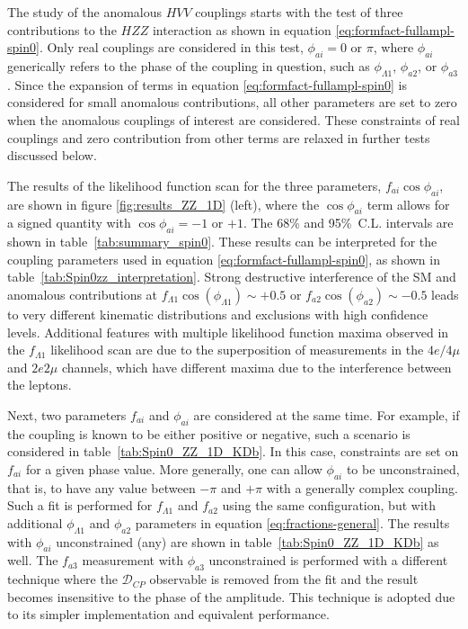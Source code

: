 The study of the anomalous $HVV$ couplings starts with the test of three contributions to the $HZZ$ interaction
as shown in equation \eqref{eq:formfact-fullampl-spin0}. Only real couplings are considered in this test,
$\phi_{ai}=0$ or $\pi$, where $\phi_{ai}$ generically refers to the phase of the coupling in question,
such as $\phi_{\Lambda1}$, $\phi_{a2}$, or $\phi_{a3}$. Since the expansion of terms in equation \eqref{eq:formfact-fullampl-spin0} is considered for small anomalous contributions,
all other parameters are set to zero when the anomalous couplings of interest are considered.
These constraints of real couplings and zero contribution from other terms are relaxed in further tests
discussed below.

The results of the likelihood function scan for the three parameters, $f_{ai}\cos\phi_{ai}$, are shown in
figure \ref{fig:results_ZZ_1D} (left), where the $\cos\phi_{ai}$ term allows for a signed quantity with
$\cos\phi_{ai}=-1$ or $+1$.
The 68\% and 95\%~C.L. intervals are shown in table~\ref{tab:summary_spin0}.
These results can be interpreted for the coupling parameters
used in equation \eqref{eq:formfact-fullampl-spin0}, as shown in table~\ref{tab:Spin0zz_interpretation}.
Strong destructive interference of the SM and anomalous contributions
at $f_{\Lambda1}\cos(\phi_{\Lambda1})\sim+0.5$ or $f_{a2}\cos(\phi_{a2})\sim-0.5$
leads to very different kinematic distributions and exclusions with high confidence levels.
Additional features with multiple likelihood function maxima observed in the $f_{\Lambda1}$ likelihood scan
are due to the superposition of measurements in the $4e/4\mu$ and $2e2\mu$ channels,
which have different maxima due to the interference between the leptons.

Next, two parameters $f_{ai}$ and $\phi_{ai}$ are considered at the same time. For example, if the coupling is known
to be either positive or negative, such a scenario is considered in table~\ref{tab:Spin0_ZZ_1D_KDb}. In this
case, constraints are set on $f_{ai}$ for a given phase value. More generally, one can allow $\phi_{ai}$ to be unconstrained,
that is, to have any value between $-\pi$ and $+\pi$ with a generally complex coupling.
Such a fit is performed for $f_{\Lambda1}$ and $f_{a2}$ using the
same configuration, but with additional $\phi_{\Lambda1}$ and $\phi_{a2}$ parameters in equation \eqref{eq:fractions-general}.
The results with $\phi_{ai}$ unconstrained (any) are shown in table~\ref{tab:Spin0_ZZ_1D_KDb} as well.
The $f_{a3}$ measurement with $\phi_{a3}$ unconstrained is performed with a different technique where the $\mathcal{D}_{C\!P}$ observable is removed from the fit and the result
becomes insensitive to the phase of the amplitude. This technique is adopted due to its simpler implementation and
equivalent performance.

